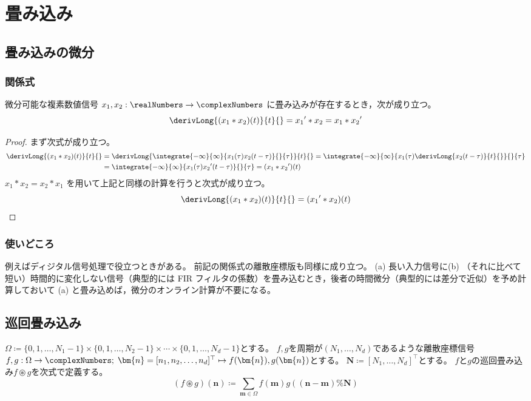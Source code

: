 \part{畳み込み}
    \chapter{畳み込みの微分}
        \section{関係式}
            \begin{shadebox}
                微分可能な複素数値信号 $x_1, x_2:\realNumbers\to\complexNumbers$ に畳み込みが存在するとき，次が成り立つ。
                \[ \derivLong{(x_1*x_2)(t)}{t}{} = {x_1}'*x_2 = x_1*{x_2}' \]
            \end{shadebox}
            \begin{proof}
                \quad\par
                まず次式が成り立つ。
                \begin{align*}
                    \derivLong{(x_1*x_2)(t)}{t}{} &= \derivLong{\integrate{-\infty}{\infty}{x_1(\tau)x_2(t-\tau)}{}{\tau}}{t}{} = \integrate{-\infty}{\infty}{x_1(\tau)\derivLong{x_2(t-\tau)}{t}{}}{}{\tau} \\
                    &= \integrate{-\infty}{\infty}{x_1(\tau){x_2}'(t-\tau)}{}{\tau} = (x_1*{x_2}')(t)
                \end{align*}
                $x_1*x_2 = x_2*x_1$ を用いて上記と同様の計算を行うと次式が成り立つ。
                \[ \derivLong{(x_1*x_2)(t)}{t}{} = ({x_1}'*x_2)(t) \]
            \end{proof}
        \section{使いどころ}
            例えばディジタル信号処理で役立つときがある。
            前記の関係式の離散座標版も同様に成り立つ。
            (a) 長い入力信号に(b) （それに比べて短い）時間的に変化しない信号（典型的には FIR フィルタの係数）を畳み込むとき，後者の時間微分（典型的には差分で近似）を予め計算しておいて (a) と畳み込めば，微分のオンライン計算が不要になる。
    \chapter{巡回畳み込み}
        \label{巡回畳み込み}
        $\Omega \coloneq \{0,1,\dots,N_1-1\}\times\{0,1,\dots,N_2-1\}\times\cdots\times\{0,1,\dots,N_d-1\}$とする。
        $f,g$を周期が$(N_1,\dots,N_d)$であるような離散座標信号$f,g: \Omega\to\complexNumbers;\;\bm{n} = [n_1,n_2,\dots,n_d]^\top \mapsto f(\bm{n}),g(\bm{n})$とする。
        $\bm{N} \coloneq [N_1,\dots,N_d]^\top$とする。
        $f$と$g$の巡回畳み込み$f\circledast g$を次式で定義する。
        \[ \left(f\circledast g\right)(\bm{n}) \coloneq \sum_{\bm{m} \in\Omega} f(\bm{m})g((\bm{n}-\bm{m})\%\bm{N}) \]

